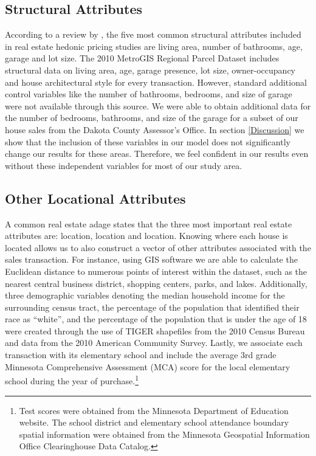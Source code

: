 \documentclass{article}\usepackage{graphicx, color}
\begin{document}
\subsection{Structural Attributes}
According to a review by \cite{Wilhelmsson2000}, the five most common structural attributes included in real estate hedonic pricing studies are living area, number of bathrooms, age, garage and lot size.  The 2010 MetroGIS Regional Parcel Dataset includes structural data on living area, age, garage presence, lot size, owner-occupancy and house architectural style for every transaction. However, standard additional control variables like the number of bathrooms, bedrooms, and size of garage were not available through this source. We were able to obtain additional data for the number of bedrooms, bathrooms, and size of the garage for a subset of our house sales from the Dakota County Assessor's Office. In section \ref{Discussion} we show that the inclusion of these variables in our model does not significantly change our results for these areas. Therefore, we feel confident in our results even without these independent variables for most of our study area. %

\subsection{Other Locational Attributes}
A common real estate adage states that the three most important real estate attributes are: location, location and location. Knowing where each house is located allows us to also construct a vector of other attributes associated with the sales transaction. For instance, using GIS software we are able to calculate the Euclidean distance to numerous points of interest within the dataset, such as the nearest central business district, shopping centers, parks, and lakes. Additionally, three demographic variables denoting the median household income for the surrounding census tract, the percentage of the population that identified their race as ``white'', and the percentage of the population that is under the age of 18 were created through the use of TIGER shapefiles from the 2010 Census Bureau and data from the 2010 American Community Survey. Lastly, we associate each transaction with its elementary school and include the average 3rd grade Minnesota Comprehensive Assessment (MCA) score for the local elementary school during the year of purchase.\footnote{Test scores were obtained from the Minnesota Department of Education website. The school district and elementary school attendance boundary spatial information were obtained from the Minnesota Geospatial Information Office Clearinghouse Data Catalog.} 
\end{document}
